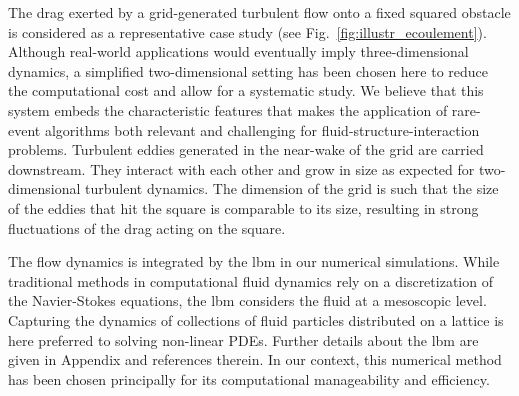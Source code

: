 \documentclass{jfm}
\begin{document}
%
The drag exerted by a grid-generated turbulent flow onto a fixed squared obstacle is considered as a representative case study (see Fig.~\ref{fig:illustr_ecoulement}). 
%
Although real-world applications would eventually imply three-dimensional dynamics, a simplified two-dimensional setting has been chosen here to reduce the computational cost and allow for a systematic study. 
% 
We believe that this system embeds the characteristic features that makes the application of rare-event algorithms both relevant and challenging for fluid-structure-interaction problems. 
%
Turbulent eddies generated in the near-wake of the grid are carried downstream.
They interact with each other and grow in size as expected for two-dimensional turbulent dynamics. 
The dimension of the grid is such that the size of the eddies that hit the square is comparable to its size, resulting in strong fluctuations of the drag acting on the square. 
%
%
%

%
The flow dynamics is integrated by the \ac{lbm} in our numerical simulations. 
While traditional methods in computational fluid dynamics rely on a discretization of the Navier-Stokes equations, the \ac{lbm} considers the fluid at a mesoscopic level.
Capturing the dynamics of collections of fluid particles distributed on a lattice is here preferred to solving non-linear PDEs. 
Further details about the \ac{lbm} are given in Appendix and references therein.
In our context, this numerical method has been chosen principally for its computational manageability and efficiency. 
\end{document}
